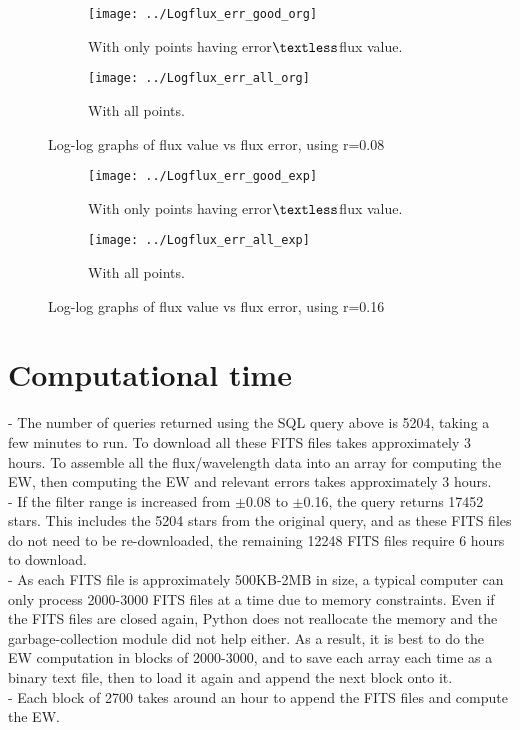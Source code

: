 \documentclass[12pt]{article}
\begin{document}
\begin{figure}
\begin{subfigure}{.5\textwidth}
\texttt{[image: ../Logflux\_err\_good\_org]}
\caption{With only points having error$\textless$flux value.}
\end{subfigure}
\begin{subfigure}{.4\textwidth}
\texttt{[image: ../Logflux\_err\_all\_org]}
\caption{With all points.}
\end{subfigure}
\caption{Log-log graphs of flux value vs flux error, using r=0.08}
\end{figure}
\begin{figure}
\begin{subfigure}{.5\textwidth}
\texttt{[image: ../Logflux\_err\_good\_exp]}
\caption{With only points having error$\textless$flux value.}
\end{subfigure}
\begin{subfigure}{.4\textwidth}
\texttt{[image: ../Logflux\_err\_all\_exp]}
\caption{With all points.}
\end{subfigure}
\caption{Log-log graphs of flux value vs flux error, using r=0.16}
\end{figure}


\section{Computational time}
- The number of queries returned using the SQL query above is 5204, taking a few minutes to run. To download all these FITS files takes approximately 3 hours. To assemble all the flux/wavelength data into an array for computing the EW, then computing the EW and relevant errors takes approximately 3 hours. \\
- If the filter range is increased from $\pm$0.08 to $\pm$0.16, the query returns 17452 stars. This includes the 5204 stars from the original query, and as these FITS files do not need to be re-downloaded, the remaining 12248 FITS files require 6 hours to download.\\
- As each FITS file is approximately 500KB-2MB in size, a typical computer can only process 2000-3000 FITS files at a time due to memory constraints. Even if the FITS files are closed again, Python does not reallocate the memory and the garbage-collection module did not help either. As a result, it is best to do the EW computation in blocks of 2000-3000, and to save each array each time as a binary text file, then to load it again and append the next block onto it.\\
- Each block of 2700 takes around an hour to append the FITS files and compute the EW.
\end{document}
